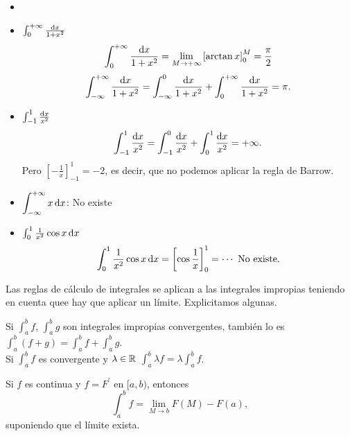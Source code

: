 \begin{example*}
    \begin{itemize}
        \item[]
        \item $\int^{+\infty}_0 \frac{\dif x}{1+x^2}$
            \[
                \int^{+\infty}_0 \frac{\dif x}{1+x^2} =
                \lim_{M \to +\infty} \left[\arctan x\right]^M_0 =
                \frac{\pi}{2}
            \]
            \[
                \int^{+\infty}_{-\infty} \frac{\dif x}{1+x^2} =
                \int^0_{-\infty} \frac{\dif x}{1+x^2} +
                \int^{+\infty}_0 \frac{\dif x}{1+x^2} = \pi.
            \]
        \item $\int^1_{-1} \frac{\dif x}{x^2}$
            \[
                \int^1_{-1} \frac{\dif x}{x^2} = \int^0_{-1}
                \frac{\dif x}{x^2} + \int^1_0 \frac{\dif x}{x^2} =
                +\infty.
            \]
            Pero $\left[-\frac{1}{x}\right]^1_{-1} = -2$, es decir, que no
            podemos aplicar la regla de Barrow.
        \item $\displaystyle \int^{+\infty}_{-\infty} x\dif x$: No existe
        \item $\int^1_0 \frac{1}{x^2}\cos x \dif x$
            \[
                \int^1_0 \frac{1}{x^2}\cos x \dif x =
                \left[ \cos \frac{1}{x} \right]^1_0 = \cdots
                \text{ No existe.}
            \]
    \end{itemize}
\end{example*}

\begin{obs}
    Las reglas de cálculo de integrales se aplican a las integrales impropias
    teniendo en cuenta quee hay que aplicar un límite. Explicitamos algunas.
\end{obs}

\begin{prop}[Linealidad]
    Si $\int^b_a f$, $\int^b_a g$ son integrales impropias convergentes, tambi\'en
    lo es $\int^b_a (f+g) = \int^b_a f + \int^b_a g$.
    \\
    Si $\int^b_a f$ es convergente y $\lambda \in \mathbb{R}$ $\int^b_a \lambda f =
    \lambda \int^b_a f$.
\end{prop}

\begin{prop}
    Si $f$ es continua y $f = F^\prime$ en $[a,b)$, entonces
    \[
        \int^b_a f = \lim_{M \to b} F(M) - F(a),
    \]
    suponiendo que el límite exista.
\end{prop}

